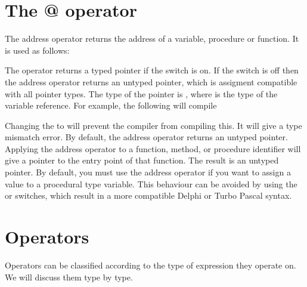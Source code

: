 \documentclass{report}
\begin{document}
\section{The @ operator}
The address operator  returns the address of a variable, procedure 
or function. It is used as follows:

The  operator returns a typed pointer if the  switch is on. 
If the  switch is off then the address operator returns an untyped
pointer, which is assigment compatible with all pointer types. The type of
the pointer is , where  is the type of the variable
reference.
For example, the following will compile
Changing the  to  will prevent the compiler from
compiling this. It will give a type mismatch error.
By default, the address operator returns an untyped pointer.
Applying the address operator to a function, method, or procedure identifier
will give a pointer to the entry point of that function. The result is an
untyped pointer. 
By default, you must use the address operator if you want to assign a value 
to a procedural type variable. This behaviour can be avoided by using the
 or  switches, which result in a more compatible Delphi or
Turbo Pascal syntax.
\section{Operators}
Operators can be classified according to the type of expression they
operate on. We will discuss them type by type.
\end{document}
